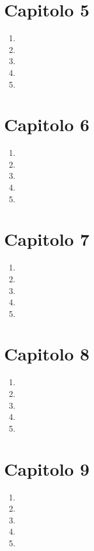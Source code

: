 \section*{Capitolo 5}
\begin{enumerate}
    \item
    \item     
    \item     
    \item     
    \item 
\end{enumerate}
\section*{Capitolo 6}
\begin{enumerate}
    \item
    \item     
    \item     
    \item     
    \item 
\end{enumerate}
\section*{Capitolo 7}
\begin{enumerate}
    \item
    \item     
    \item     
    \item     
    \item 
\end{enumerate}
\section*{Capitolo 8}
\begin{enumerate}
    \item
    \item     
    \item     
    \item     
    \item 
\end{enumerate}
\section*{Capitolo 9}
\begin{enumerate}
    \item
    \item     
    \item     
    \item     
    \item 
\end{enumerate}

